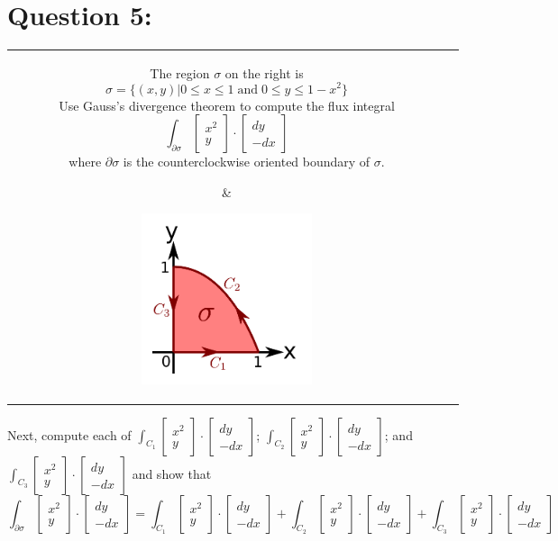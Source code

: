 \documentclass{article}
\newcommand{\colxyvec}[2]{\begin{bmatrix} #1 \\ #2 \end{bmatrix}}
\begin{document}
\section*{Question 5:}

\begin{tabular}{cc}
\parbox{0.6\textwidth}{ 
The region \(\sigma\) on the right is 
\[\sigma = \{(x,y) | 0 \leq x \leq 1 \;\text{and}\; 0 \leq y \leq 1 - x^2\}\]
Use Gauss's divergence theorem to compute the flux integral
\[\int_{\partial\sigma} \colxyvec{x^2}{y} \cdot \colxyvec{dy}{-dx}\]
where \(\partial\sigma\) is the counterclockwise oriented boundary of \(\sigma\).
} & \parbox{0.4\textwidth}{
\includegraphics[width = 0.4\textwidth]{Test_bench_part_4x_images/Test_bench_part_4x_image_4}
}
\end{tabular}
Next, compute each of \(\int_{C_1} \colxyvec{x^2}{y} \cdot \colxyvec{dy}{-dx}\); \(\int_{C_2} \colxyvec{x^2}{y} \cdot \colxyvec{dy}{-dx}\); and \(\int_{C_3} \colxyvec{x^2}{y} \cdot \colxyvec{dy}{-dx}\) and show that 
\[\int_{\partial\sigma} \colxyvec{x^2}{y} \cdot \colxyvec{dy}{-dx} = \int_{C_1} \colxyvec{x^2}{y} \cdot \colxyvec{dy}{-dx} + \int_{C_2} \colxyvec{x^2}{y} \cdot \colxyvec{dy}{-dx}+ \int_{C_3} \colxyvec{x^2}{y} \cdot \colxyvec{dy}{-dx}\]  
\end{document}
